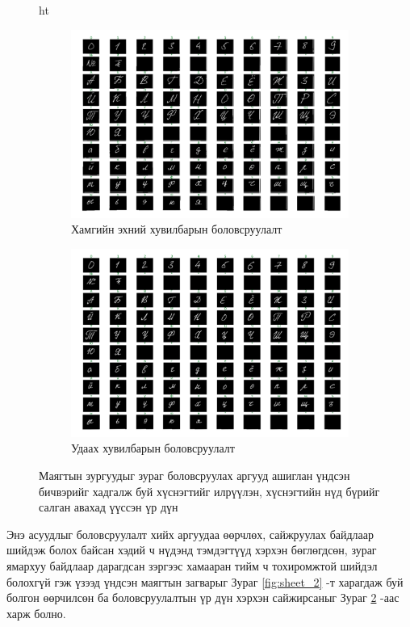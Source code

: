 \begin{figure}{ht}
	\begin{subfigure}{0.5\textwidth}
		\includegraphics[width=0.9\linewidth]{images/sheet_1_segmented}
		\caption{Хамгийн эхний хувилбарын боловсруулалт}
		\label{fig:sheet_1_segmented}
	\end{subfigure}
	\begin{subfigure}{0.5\textwidth}
		\includegraphics[width=0.9\linewidth]{images/sheet_2_segmented}
		\caption{Удаах хувилбарын боловсруулалт}
		\label{fig:sheet_2_segmented}
	\end{subfigure}
	\caption{Маягтын зургуудыг зураг боловсруулах аргууд ашиглан үндсэн бичвэрийг хадгалж буй хүснэгтийг илрүүлэн, хүснэгтийн нүд бүрийг салган авахад үүссэн үр дүн}
	\label{fig:sheets_cropped}
\end{figure}

Энэ асуудлыг боловсруулалт хийх аргуудаа өөрчлөх, сайжруулах байдлаар шийдэж болох байсан хэдий ч нүдэнд тэмдэгтүүд хэрхэн бөглөгдсөн, зураг ямархуу байдлаар дарагдсан зэргээс хамааран тийм ч тохиромжтой шийдэл болохгүй гэж үзээд үндсэн маягтын загварыг Зураг \ref{fig:sheet_2} -т харагдаж буй болгон өөрчилсөн ба боловсруулалтын үр дүн хэрхэн сайжирсаныг Зураг \ref{fig:sheet_2_segmented} -аас харж болно.

